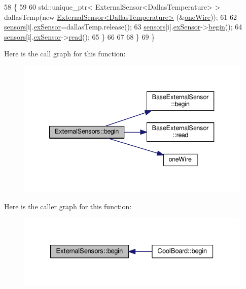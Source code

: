 \begin{DoxyCode}
58         \{
59 
60             std::unique\_ptr< ExternalSensor<DallasTemperature> > dallasTemp(\textcolor{keyword}{new} 
      \hyperlink{class_external_sensor_3_01_dallas_temperature_01_4}{ExternalSensor<DallasTemperature>} (&\hyperlink{_external_sensors_8cpp_af39fa3dad1ba161b384c0b26b8145e65}{oneWire}));
61              
62             \hyperlink{class_external_sensors_a284233f884fcf00154a44740cf1d9e1e}{sensors}[i].\hyperlink{struct_external_sensors_1_1sensor_a9bca150fd468b8d0e090e6d72c5c2b48}{exSensor}=dallasTemp.release();
63             \hyperlink{class_external_sensors_a284233f884fcf00154a44740cf1d9e1e}{sensors}[i].\hyperlink{struct_external_sensors_1_1sensor_a9bca150fd468b8d0e090e6d72c5c2b48}{exSensor}->\hyperlink{class_base_external_sensor_a87d132803d4f4fdd4e66332809f0c9a0}{begin}();
64             \hyperlink{class_external_sensors_a284233f884fcf00154a44740cf1d9e1e}{sensors}[i].\hyperlink{struct_external_sensors_1_1sensor_a9bca150fd468b8d0e090e6d72c5c2b48}{exSensor}->\hyperlink{class_base_external_sensor_a1564f16deacf57b51b9948ac29db4291}{read}();
65         \}
66         
67         
68     \}
69 \}
\end{DoxyCode}
Here is the call graph for this function\+:
\nopagebreak
\begin{figure}[H]
\begin{center}
\leavevmode
\includegraphics[width=340pt]{d1/d2f/class_external_sensors_a58ede0d786a86417254708870f04a21e_cgraph}
\end{center}
\end{figure}
Here is the caller graph for this function\+:\nopagebreak
\begin{figure}[H]
\begin{center}
\leavevmode
\includegraphics[width=326pt]{d1/d2f/class_external_sensors_a58ede0d786a86417254708870f04a21e_icgraph}
\end{center}
\end{figure}
\mbox{\label{class_external_sensors_a862a4bd11346b37270d0244c2adabe5a}} 
